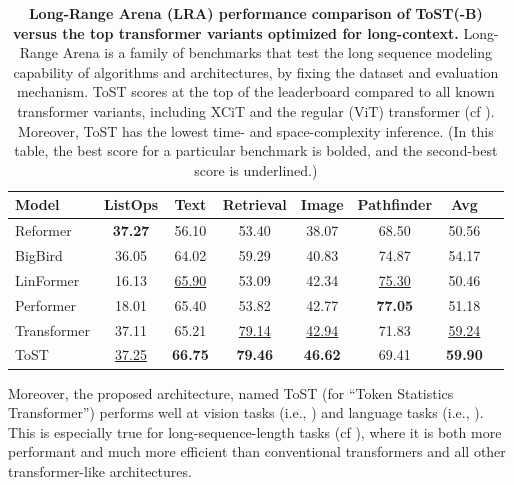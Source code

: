 \documentclass[../../book-main.tex]{subfiles}
\begin{document}
\begin{table}
    \centering
    
    \begin{tabular}{@{}lccccccc@{}}
            \toprule
            Model        & ListOps  & Text     & Retrieval & Image    & Pathfinder & Avg      \\
            \midrule
            \midrule
            Reformer              & \textbf{37.27} & 56.10             & 53.40              & 38.07             & 68.50               & 50.56             \\
            BigBird               & 36.05             & 64.02             & 59.29              & 40.83             & 74.87                & 54.17             \\
            LinFormer         & 16.13             & \underline{65.90} & 53.09              & 42.34             & \underline{75.30}               & 50.46             \\
            Performer             & 18.01             & 65.40             & 53.82              & 42.77             & \textbf{77.05}                & 51.18             \\
            Transformer           & 37.11             & 65.21             & \underline{79.14}              & \underline{42.94}             & 71.83              & \underline{59.24}            \\
            ToST & \underline{37.25}    & \textbf{66.75}    & \textbf{79.46}     & \textbf{46.62}    &    69.41      &     \textbf{59.90}\\
            
            \bottomrule
        \end{tabular}%
    \caption{\small \textbf{Long-Range Arena (LRA) performance comparison of ToST(-B) versus the top transformer variants optimized for long-context.} Long-Range Arena is a family of benchmarks that test the long sequence modeling capability of algorithms and architectures, by fixing the dataset and evaluation mechanism. ToST scores at the top of the leaderboard compared to all known transformer variants, including XCiT and the regular (ViT) transformer (cf ). Moreover, ToST has the lowest time- and space-complexity inference. (In this table, the best score for a particular benchmark is bolded, and the second-best score is underlined.)}
    \label{tab:tost_lra_results}
\end{table}

Moreover, the proposed architecture, named ToST (for ``Token Statistics Transformer'') performs well at vision tasks (i.e., ) and language tasks (i.e., ). This is especially true for long-sequence-length tasks (cf ), where it is both more performant and much more efficient than conventional transformers and all other transformer-like architectures.
\end{document}

